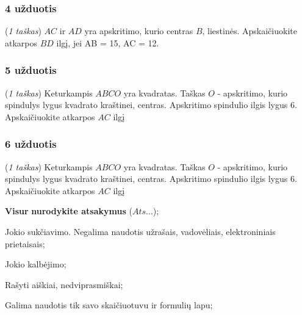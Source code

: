 \documentclass[a4paper]{article}
\begin{document}
\subsubsection*{4 užduotis}

\begin{minipage}[t]{0.25\textwidth}
      \centering
\end{minipage}\hfill
\begin{minipage}{0.69\textwidth}
      (\textit{1 taškas}) $AC$ ir $AD$ yra apskritimo, kurio centras $B$, liestinės. 
      Apskaičiuokite atkarpos $BD$ ilgį, jei AB = 15, AC = 12. 
\end{minipage}

\subsubsection*{5 užduotis}

\begin{minipage}[t]{0.25\textwidth}
      \centering
\end{minipage}\hfill
\begin{minipage}{0.69\textwidth}
      (\textit{1 taškas}) Keturkampis $ABCO$ yra kvadratas. Taškas $O$ - apskritimo,
      kurio spindulys lygus kvadrato kraštinei, centras.
      Apskritimo spindulio ilgis lygus $6$.
      Apskaičiuokite atkarpos $AC$ ilgį
\end{minipage}

\subsubsection*{6 užduotis}

\begin{minipage}[t]{0.22\textwidth}
      \centering
\end{minipage}\hfill
\begin{minipage}{0.69\textwidth}
      (\textit{1 taškas}) Keturkampis $ABCO$ yra kvadratas. Taškas $O$ - apskritimo,
      kurio spindulys lygus kvadrato kraštinei, centras.
      Apskritimo spindulio ilgis lygus $6$.
      Apskaičiuokite atkarpos $AC$ ilgį
\end{minipage}

\vfill
\begin{small}
      \begin{enumerate*}[label={(\arabic*)}]
            \item \textbf{Visur} \textbf{nurodykite atsakymus} ($Ats\ldots$);
            \item Jokio sukčiavimo. Negalima naudotis užrašais, vadovėliais,
            elektroniniais prietaisais;
            \item Jokio kalbėjimo;
            \item Rašyti aiškiai, nedviprasmiškai;
            \item Galima naudotis tik savo skaičiuotuvu ir formulių lapu;
      \end{enumerate*}
\end{small}
\end{document}
